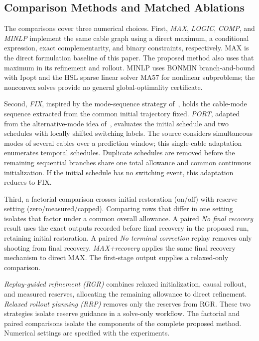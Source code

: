 \subsection{Comparison Methods and Matched Ablations}
The comparisons cover three numerical choices. First, \emph{MAX}, \emph{LOGIC}, \emph{COMP}, and \emph{MINLP} implement the same cable graph using a direct maximum, a conditional expression, exact complementarity, and binary constraints, respectively. MAX is the direct formulation baseline of this paper. The proposed method also uses that maximum in its refinement and rollout. MINLP uses BONMIN branch-and-bound with Ipopt and the HSL sparse linear solver MA57 for nonlinear subproblems; the nonconvex solves provide no general global-optimality certificate.

Second, \emph{FIX}, inspired by the mode-sequence strategy of~\cite{zhang2026}, holds the cable-mode sequence extracted from the common initial trajectory fixed. \emph{PORT}, adapted from the alternative-mode idea of~\cite{yang2022}, evaluates the initial schedule and two schedules with locally shifted switching labels. The source considers simultaneous modes of several cables over a prediction window; this single-cable adaptation enumerates temporal schedules. Duplicate schedules are removed before the remaining sequential branches share one total allowance and common continuous initialization. If the initial schedule has no switching event, this adaptation reduces to FIX.

Third, a factorial comparison crosses initial restoration (on/off) with reserve setting (zero/measured/capped). Comparing rows that differ in one setting isolates that factor under a common overall allowance. A paired \emph{No final recovery} result uses the exact outputs recorded before final recovery in the proposed run, retaining initial restoration. A paired \emph{No terminal correction} replay removes only shooting from final recovery. \emph{MAX+recovery} applies the same final recovery mechanism to direct MAX. The first-stage output supplies a relaxed-only comparison.

\emph{Replay-guided refinement (RGR)} combines relaxed initialization, causal rollout, and measured reserves, allocating the remaining allowance to direct refinement. \emph{Relaxed rollout planning (RRP)} removes only the reserves from RGR. These two strategies isolate reserve guidance in a solve-only workflow. The factorial and paired comparisons isolate the components of the complete proposed method. Numerical settings are specified with the experiments.
